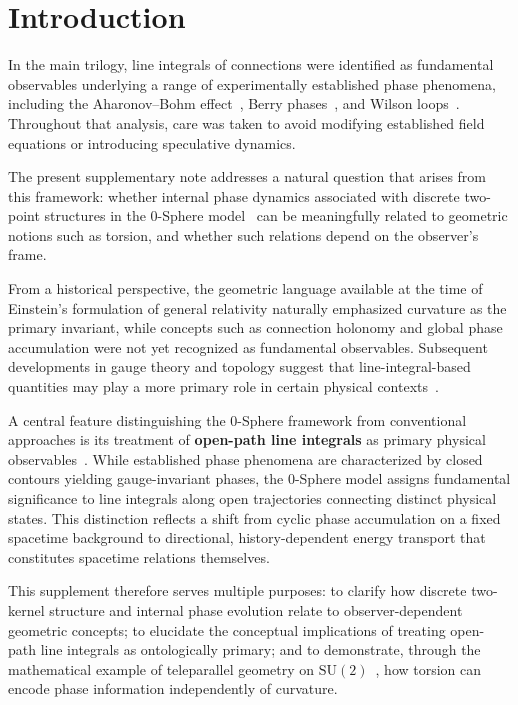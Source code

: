 \documentclass[12pt,letterpaper]{article}
\begin{document}
\clearpage

\section{Introduction}

\justifying
In the main trilogy, line integrals of connections were identified as fundamental observables underlying a range of experimentally established phase phenomena, including the Aharonov--Bohm effect~\cite{ABEffect}, Berry phases~\cite{Berry1984}, and Wilson loops~\cite{WilsonLoop,hanamura18067760,hanamura18135855,hanamura18203433}. Throughout that analysis, care was taken to avoid modifying established field equations or introducing speculative dynamics.

The present supplementary note addresses a natural question that arises from this framework: whether internal phase dynamics associated with discrete two-point structures in the 0-Sphere model~\cite{hanamura16759284} can be meaningfully related to geometric notions such as torsion, and whether such relations depend on the observer's frame.

From a historical perspective, the geometric language available at the time of Einstein's formulation of general relativity naturally emphasized curvature as the primary invariant, while concepts such as connection holonomy and global phase accumulation were not yet recognized as fundamental observables. Subsequent developments in gauge theory and topology suggest that line-integral-based quantities may play a more primary role in certain physical contexts~\cite{hanamura18135855,hanamura18203433}.

A central feature distinguishing the 0-Sphere framework from conventional approaches is its treatment of \textbf{open-path line integrals} as primary physical observables~\cite{hanamura18203433}. While established phase phenomena are characterized by closed contours yielding gauge-invariant phases, the 0-Sphere model assigns fundamental significance to line integrals along open trajectories connecting distinct physical states. This distinction reflects a shift from cyclic phase accumulation on a fixed spacetime background to directional, history-dependent energy transport that constitutes spacetime relations themselves.

This supplement therefore serves multiple purposes: to clarify how discrete two-kernel structure and internal phase evolution relate to observer-dependent geometric concepts; to elucidate the conceptual implications of treating open-path line integrals as ontologically primary; and to demonstrate, through the mathematical example of teleparallel geometry on $\mathrm{SU}(2)$~\cite{Weitzenbock1923,Aldrovandi2013}, how torsion can encode phase information independently of curvature.
\end{document}
